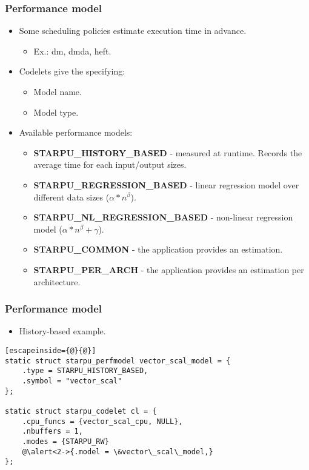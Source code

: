 \begin{frame}[fragile]
  \frametitle{Performance model}
  \begin{itemize}
  \item Some scheduling policies estimate execution time in advance.
    \begin{itemize}
    \item Ex.: dm, dmda, heft.
    \end{itemize}
  
  \item Codelets give the  specifying:
    \begin{itemize}
    \item Model name.
    \item Model type.
    \end{itemize}

  \item Available performance models:
    \begin{itemize}
    \item \textbf{STARPU\_HISTORY\_BASED} - measured at runtime. Records the
    average time for each input/output sizes.
    \item \textbf{STARPU\_REGRESSION\_BASED} - linear regression model over different data sizes
       ($\alpha*n^\beta$).
    \item \textbf{STARPU\_NL\_REGRESSION\_BASED} - non-linear regression model ($\alpha*n^\beta+\gamma$).
    \item \textbf{STARPU\_COMMON} - the application provides an estimation.
    \item \textbf{STARPU\_PER\_ARCH} - the application provides an estimation per architecture.
    \end{itemize}
  \end{itemize}
\end{frame}
\begin{frame}[fragile]
  \frametitle{Performance model}
  \begin{itemize}
  \item History-based example.
  \end{itemize}
  \begin{block}{}
\begin{lstlisting}[escapeinside={@}{@}]
static struct starpu_perfmodel vector_scal_model = {
    .type = STARPU_HISTORY_BASED,
    .symbol = "vector_scal"
};

static struct starpu_codelet cl = {
    .cpu_funcs = {vector_scal_cpu, NULL},
    .nbuffers = 1,
    .modes = {STARPU_RW}
    @\alert<2->{.model = \&vector\_scal\_model,}
};
\end{lstlisting}
  \end{block}
\end{frame}
